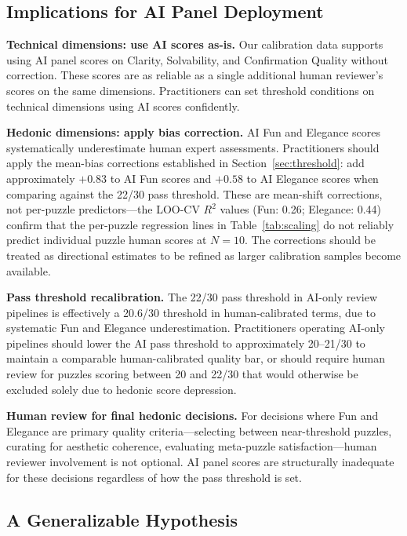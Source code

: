 \subsection{Implications for AI Panel Deployment}

\textbf{Technical dimensions: use AI scores as-is.} Our calibration data supports using AI panel scores on Clarity, Solvability, and Confirmation Quality without correction. These scores are as reliable as a single additional human reviewer's scores on the same dimensions. Practitioners can set threshold conditions on technical dimensions using AI scores confidently.

\textbf{Hedonic dimensions: apply bias correction.} AI Fun and Elegance scores systematically underestimate human expert assessments. Practitioners should apply the mean-bias corrections established in Section~\ref{sec:threshold}: add approximately $+0.83$ to AI Fun scores and $+0.58$ to AI Elegance scores when comparing against the 22/30 pass threshold. These are mean-shift corrections, not per-puzzle predictors---the LOO-CV $R^2$ values (Fun: 0.26; Elegance: 0.44) confirm that the per-puzzle regression lines in Table~\ref{tab:scaling} do not reliably predict individual puzzle human scores at $N=10$. The corrections should be treated as directional estimates to be refined as larger calibration samples become available.

\textbf{Pass threshold recalibration.} The 22/30 pass threshold in AI-only review pipelines is effectively a 20.6/30 threshold in human-calibrated terms, due to systematic Fun and Elegance underestimation. Practitioners operating AI-only pipelines should lower the AI pass threshold to approximately 20--21/30 to maintain a comparable human-calibrated quality bar, or should require human review for puzzles scoring between 20 and 22/30 that would otherwise be excluded solely due to hedonic score depression.

\textbf{Human review for final hedonic decisions.} For decisions where Fun and Elegance are primary quality criteria---selecting between near-threshold puzzles, curating for aesthetic coherence, evaluating meta-puzzle satisfaction---human reviewer involvement is not optional. AI panel scores are structurally inadequate for these decisions regardless of how the pass threshold is set.

\subsection{A Generalizable Hypothesis}

